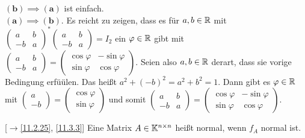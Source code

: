 \documentclass[../../main.tex]{subfiles}
\begin{document}
\begin{cproof}
$\boldsymbol{(b)\implies (a)}$ ist einfach.\\
		
\noindent$\boldsymbol{(a)\implies (b)}$. Es reicht zu zeigen, dass es für $a,b\in \mathbb R$ mit $\left(\begin{smallmatrix*}a & b\\ -b& a\end{smallmatrix*}\right)^*\left(\begin{smallmatrix*}a & b\\ -b& a\end{smallmatrix*}\right)=I_2$ ein $\varphi\in \mathbb R$ gibt mit $\left(\begin{smallmatrix*}a & b\\ -b& a\end{smallmatrix*}\right)=\left(\begin{smallmatrix*}\cos\varphi&-\sin\varphi\\ \sin\varphi&\cos \varphi\end{smallmatrix*}\right)$. Seien also $a,b\in \mathbb R$ derart, dass sie vorige Bedingung erfüülen. Das heißt $a^2+(-b)^2=a^2+b^2=1$. Dann gibt es $\varphi\in \mathbb R$ mit $\left(\begin{smallmatrix*}a\\-b\end{smallmatrix*}\right)=\left(\begin{smallmatrix*}\cos\varphi\\\sin\varphi\end{smallmatrix*}\right)$ und somit $\left(\begin{smallmatrix*}a & b\\ -b& a\end{smallmatrix*}\right)=\left(\begin{smallmatrix*}\cos\varphi&-\sin\varphi\\ \sin\varphi&\cos \varphi\end{smallmatrix*}\right)$.
\end{cproof}

\begin{df}\mbox{}[$\to$\ref{11.2.25}, \ref{11.3.3}]
\label{15.2.12}
Eine Matrix $A\in \mathbb K^{n\times n}$ heißt normal, wenn $f_A$ normal ist.
\end{df}
\end{document}
